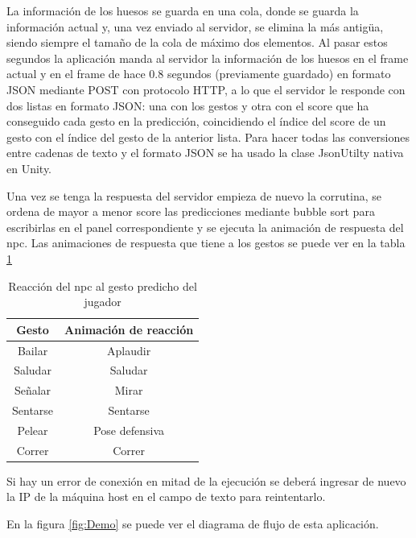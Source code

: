 La información de los huesos se guarda en una cola, donde se guarda la información actual y, una vez enviado al servidor, se elimina la más antigüa, siendo siempre el tamaño de la cola de máximo dos elementos.
Al pasar estos segundos la aplicación manda al servidor la información de los huesos en el frame actual y en el frame de hace 0.8 segundos (previamente guardado) en formato JSON mediante POST con protocolo HTTP, a lo que el servidor le responde con dos listas en formato JSON: una con los gestos y otra con el score que ha conseguido cada gesto en la predicción, coincidiendo el índice del score de un gesto con el índice del gesto de la anterior lista.
Para hacer todas las conversiones entre cadenas de texto y el formato JSON se ha usado la clase JsonUtilty nativa en Unity.

Una vez se tenga la respuesta del servidor empieza de nuevo la corrutina, se ordena de mayor a menor score las predicciones mediante bubble sort para escribirlas en el panel correspondiente y se ejecuta la animación de respuesta del \gls{npc}.
Las animaciones de respuesta que tiene a los gestos se puede ver en la tabla \ref{tab:gestos-reaccion}

\begin{table}[H]
    \begin{center}
        \begin{tabular}{| c | c |}
            \hline
            Gesto & Animación de reacción \\ \hline
            Bailar & Aplaudir \\
            Saludar & Saludar \\
            Señalar & Mirar \\ 
            Sentarse & Sentarse \\
            Pelear & Pose defensiva \\
            Correr & Correr \\ \hline
        \end{tabular}
        \caption{Reacción del \gls{npc} al gesto predicho del jugador}
        \label{tab:gestos-reaccion}
    \end{center}
\end{table}

Si hay un error de conexión en mitad de la ejecución se deberá ingresar de nuevo la IP de la máquina host en el campo de texto para reintentarlo.

En la figura \ref{fig:Demo} se puede ver el diagrama de flujo de esta aplicación.

